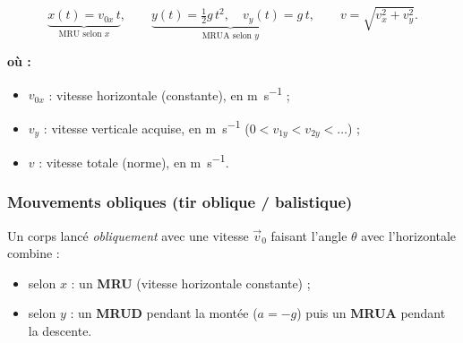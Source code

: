 \documentclass[11pt,a4paper]{article}
\newenvironment{ou}{%
  \par\smallskip\noindent\textbf{où :}\nopagebreak
  \begin{itemize}[leftmargin=1.8em,topsep=2pt,itemsep=1.5pt,parsep=0pt]}%
  {\end{itemize}}
\newcommand{\vv}[1]{\vec{#1}}
\begin{document}
\begin{center}
\end{center}

\begin{formule}[tir horizontal ($v_{0y}=0$, axe $y$ vers le bas)]
\[ \underbrace{x(t)=v_{0x}\,t}_{\text{MRU selon }x},\qquad
   \underbrace{y(t)=\tfrac12 g\,t^2,\quad v_y(t)=g\,t}_{\text{MRUA selon }y},\qquad
   v=\sqrt{v_x^2+v_y^2}. \]
\begin{ou}
  \item $v_{0x}$ : vitesse horizontale (constante), en \si{\metre\per\second} ;
  \item $v_y$ : vitesse verticale acquise, en \si{\metre\per\second} ($0<v_{1y}<v_{2y}<\dots$) ;
  \item $v$ : vitesse totale (norme), en \si{\metre\per\second}.
\end{ou}
\end{formule}

\subsubsection{Mouvements obliques (tir oblique / balistique)}

Un corps lancé \emph{obliquement} avec une vitesse $\vv{v}_0$ faisant l'angle $\theta$ avec l'horizontale
combine :
\begin{itemize}[leftmargin=1.6em,topsep=2pt]
  \item selon $x$ : un \textbf{MRU} (vitesse horizontale constante) ;
  \item selon $y$ : un \textbf{MRUD} pendant la montée ($a=-g$) puis un \textbf{MRUA} pendant la descente.
\end{itemize}
\end{document}
